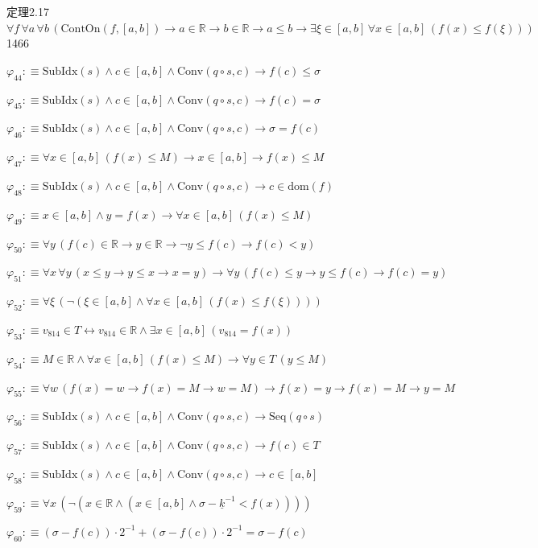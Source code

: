 \begin{fullproof}{定理2.17}{$\forall f\,\forall a\,\forall b\,(\mathrm{ContOn}(f,[a,b]) \to a \in \mathbb{R} \to b \in \mathbb{R} \to a \leq b \to \exists \xi \in [a,b]\,\forall x \in [a,b]\,(f(x) \leq f(\xi)))$}{1466}
\begin{abbrevlist}
\item $\varphi_{44} :\equiv \mathrm{SubIdx}(s) \land c \in [a,b] \land \mathrm{Conv}(q \circ s,c) \to f(c) \leq \sigma$
\item $\varphi_{45} :\equiv \mathrm{SubIdx}(s) \land c \in [a,b] \land \mathrm{Conv}(q \circ s,c) \to f(c) = \sigma$
\item $\varphi_{46} :\equiv \mathrm{SubIdx}(s) \land c \in [a,b] \land \mathrm{Conv}(q \circ s,c) \to \sigma = f(c)$
\item $\varphi_{47} :\equiv \forall x \in [a,b]\,(f(x) \leq M) \to x \in [a,b] \to f(x) \leq M$
\item $\varphi_{48} :\equiv \mathrm{SubIdx}(s) \land c \in [a,b] \land \mathrm{Conv}(q \circ s,c) \to c \in \mathrm{dom}(f)$
\item $\varphi_{49} :\equiv x \in [a,b] \land y = f(x) \to \forall x \in [a,b]\,(f(x) \leq M)$
\item $\varphi_{50} :\equiv \forall y\,(f(c) \in \mathbb{R} \to y \in \mathbb{R} \to \neg y \leq f(c) \to f(c) < y)$
\item $\varphi_{51} :\equiv \forall x\,\forall y\,(x \leq y \to y \leq x \to x = y) \to \forall y\,(f(c) \leq y \to y \leq f(c) \to f(c) = y)$
\item $\varphi_{52} :\equiv \forall \xi\,(\neg (\xi \in [a,b] \land \forall x \in [a,b]\,(f(x) \leq f(\xi))))$
\item $\varphi_{53} :\equiv v_{814} \in T \leftrightarrow v_{814} \in \mathbb{R} \land \exists x \in [a,b]\,(v_{814} = f(x))$
\item $\varphi_{54} :\equiv M \in \mathbb{R} \land \forall x \in [a,b]\,(f(x) \leq M) \to \forall y \in T\,(y \leq M)$
\item $\varphi_{55} :\equiv \forall w\,(f(x) = w \to f(x) = M \to w = M) \to f(x) = y \to f(x) = M \to y = M$
\item $\varphi_{56} :\equiv \mathrm{SubIdx}(s) \land c \in [a,b] \land \mathrm{Conv}(q \circ s,c) \to \mathrm{Seq}(q \circ s)$
\item $\varphi_{57} :\equiv \mathrm{SubIdx}(s) \land c \in [a,b] \land \mathrm{Conv}(q \circ s,c) \to f(c) \in T$
\item $\varphi_{58} :\equiv \mathrm{SubIdx}(s) \land c \in [a,b] \land \mathrm{Conv}(q \circ s,c) \to c \in [a,b]$
\item $\varphi_{59} :\equiv \forall x\,(\neg (x \in \mathbb{R} \land (x \in [a,b] \land \sigma - \underline{k}^{-1} < f(x))))$
\item $\varphi_{60} :\equiv (\sigma - f(c)) \cdot 2^{-1} + (\sigma - f(c)) \cdot 2^{-1} = \sigma - f(c)$

\end{abbrevlist}
\end{fullproof}
